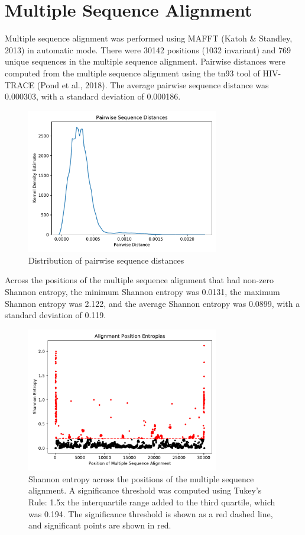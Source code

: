 \documentclass{article}
\begin{document}
\section{Multiple Sequence Alignment}
Multiple sequence alignment was performed using MAFFT (Katoh \& Standley, 2013) in automatic mode. There were 30142 positions (1032 invariant) and 769 unique sequences in the multiple sequence alignment. Pairwise distances were computed from the multiple sequence alignment using the tn93 tool of HIV-TRACE (Pond et al., 2018). The average pairwise sequence distance was 0.000303, with a standard deviation of 0.000186.

\begin{figure}[h]
\centering
\includegraphics[width=0.75\textwidth,keepaspectratio]{./figs/pairwise_distances_sequences.pdf}
\caption{Distribution of pairwise sequence distances}
\end{figure}

 Across the positions of the multiple sequence alignment that had non-zero Shannon entropy, the minimum Shannon entropy was 0.0131, the maximum Shannon entropy was 2.122, and the average Shannon entropy was 0.0899, with a standard deviation of 0.119.

\begin{figure}[h]
\centering
\includegraphics[width=0.75\textwidth,keepaspectratio]{./figs/alignment_entropies.pdf}
\caption{Shannon entropy across the positions of the multiple sequence alignment. A significance threshold was computed using Tukey's Rule: 1.5x the interquartile range added to the third quartile, which was 0.194. The significance threshold is shown as a red dashed line, and significant points are shown in red.}
\end{figure}
\end{document}
